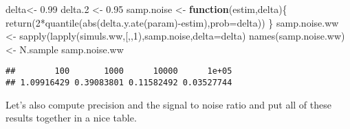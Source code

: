 \documentclass[
]{book}
\newenvironment{Shaded}{\begin{snugshade}}{\end{snugshade}}
\newcommand{\AttributeTok}[1]{\textcolor[rgb]{0.77,0.63,0.00}{#1}}
\newcommand{\ControlFlowTok}[1]{\textcolor[rgb]{0.13,0.29,0.53}{\textbf{#1}}}
\newcommand{\DecValTok}[1]{\textcolor[rgb]{0.00,0.00,0.81}{#1}}
\newcommand{\FloatTok}[1]{\textcolor[rgb]{0.00,0.00,0.81}{#1}}
\newcommand{\FunctionTok}[1]{\textcolor[rgb]{0.00,0.00,0.00}{#1}}
\newcommand{\NormalTok}[1]{#1}
\newcommand{\OtherTok}[1]{\textcolor[rgb]{0.56,0.35,0.01}{#1}}
\newcommand{\SpecialCharTok}[1]{\textcolor[rgb]{0.00,0.00,0.00}{#1}}
\newcommand{\StringTok}[1]{\textcolor[rgb]{0.31,0.60,0.02}{#1}}
\theoremstyle{definition}
\theoremstyle{definition}
\theoremstyle{definition}
\theoremstyle{definition}
\theoremstyle{remark}
\begin{document}
\begin{Shaded}
\begin{Highlighting}[]
\NormalTok{delta}\OtherTok{\textless{}{-}} \FloatTok{0.99}
\NormalTok{delta}\FloatTok{.2} \OtherTok{\textless{}{-}} \FloatTok{0.95}
\NormalTok{samp.noise }\OtherTok{\textless{}{-}} \ControlFlowTok{function}\NormalTok{(estim,delta)\{}
  \FunctionTok{return}\NormalTok{(}\DecValTok{2}\SpecialCharTok{*}\FunctionTok{quantile}\NormalTok{(}\FunctionTok{abs}\NormalTok{(}\FunctionTok{delta.y.ate}\NormalTok{(param)}\SpecialCharTok{{-}}\NormalTok{estim),}\AttributeTok{prob=}\NormalTok{delta))}
\NormalTok{\}}
\NormalTok{samp.noise.ww }\OtherTok{\textless{}{-}} \FunctionTok{sapply}\NormalTok{(}\FunctionTok{lapply}\NormalTok{(simuls.ww,}\StringTok{\textasciigrave{}}\AttributeTok{[}\StringTok{\textasciigrave{}}\NormalTok{,,}\DecValTok{1}\NormalTok{),samp.noise,}\AttributeTok{delta=}\NormalTok{delta)}
\FunctionTok{names}\NormalTok{(samp.noise.ww) }\OtherTok{\textless{}{-}}\NormalTok{ N.sample}
\NormalTok{samp.noise.ww}
\end{Highlighting}
\end{Shaded}

\begin{verbatim}
##        100       1000      10000      1e+05 
## 1.09916429 0.39083801 0.11582492 0.03527744
\end{verbatim}

Let's also compute precision and the signal to noise ratio and put all of these results together in a nice table.
\end{document}
